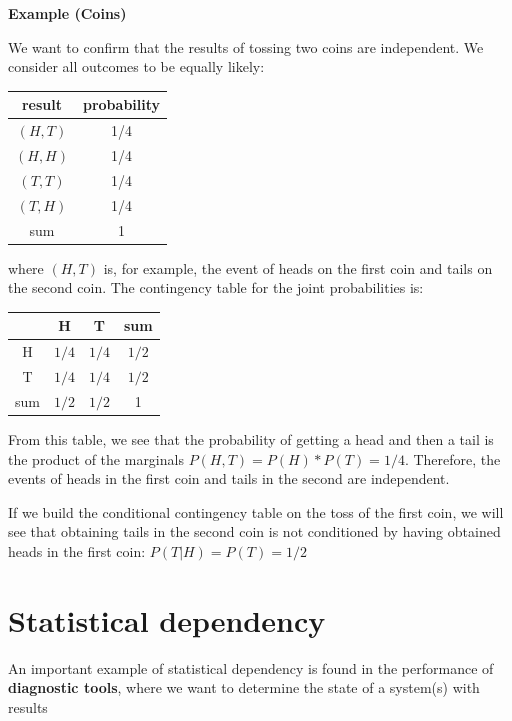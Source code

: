 \documentclass[
]{book}
\begin{document}
\textbf{Example (Coins)}

We want to confirm that the results of tossing two coins are independent. We consider all outcomes to be equally likely:

\begin{longtable}[]{@{}cc@{}}
\toprule\noalign{}
result & probability \\
\midrule\noalign{}
\endhead
\bottomrule\noalign{}
\endlastfoot
\(( H,T )\) & 1/4 \\
\(( H,H )\) & 1/4 \\
\(( T,T )\) & 1/4 \\
\(( T, H )\) & 1/4 \\
sum & 1 \\
\end{longtable}

where \(( H,T )\) is, for example, the event of heads on the first coin and tails on the second coin. The contingency table for the joint probabilities is:

\begin{longtable}[]{@{}cccc@{}}
\toprule\noalign{}
& H & T & sum \\
\midrule\noalign{}
\endhead
\bottomrule\noalign{}
\endlastfoot
H & \(1/4\) & \(1/4\) & \(1/2\) \\
T & \(1/4\) & \(1/4\) & \(1/2\) \\
sum & \(1/2\) & \(1/2\) & 1 \\
\end{longtable}

From this table, we see that the probability of getting a head and then a tail is the product of the marginals \(P( H, T)=P(H)*P(T)=1/4\). Therefore, the events of heads in the first coin and tails in the second are independent.

If we build the conditional contingency table on the toss of the first coin, we will see that obtaining tails in the second coin is not conditioned by having obtained heads in the first coin: \(P(T| H)= P(T) =1 / 2\)

\hypertarget{statistical-dependency}{%
\section{Statistical dependency}\label{statistical-dependency}}

An important example of statistical dependency is found in the performance of \textbf{diagnostic tools}, where we want to determine the state of a system(s) with results
\end{document}

